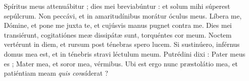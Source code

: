 \lettrine{S}{}píritus meus attenuábitur ; dies mei breviabúntur : et solum mihi súperest sepúlcrum.
Non peccávi, et in amaritudínibus morátur óculus meus.
Líbera me, Dómine, et pone me juxta te, et cujúsvis manus pugnet contra me.
Dies mei transiérunt, cogitatiónes meæ dissipátæ sunt, torquéntes cor meum.
Noctem vertérunt in diem, et rursum post ténebras spero lucem.
Si sustinúero, inférnus domus mea est, et in ténebris stravi léctulum meum.
Putrédini dixi : Pater meus es ; Mater mea, et soror mea, vérmibus.
Ubi est ergo nunc præstolátio mea, et patiéntiam meam \textit{quis con}síderat ?